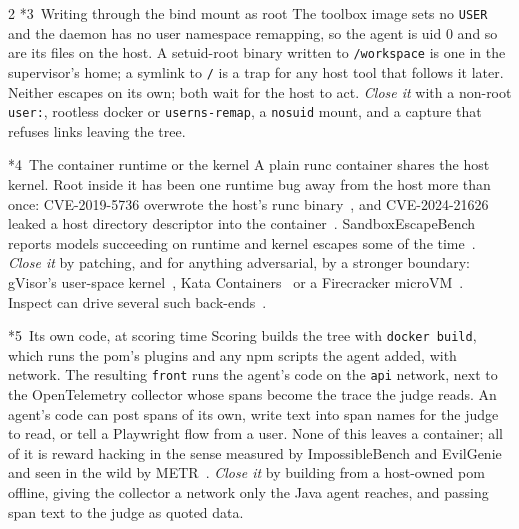 \documentclass[10pt,a4paper]{article}
\makeatletter
\renewcommand\subsection{\@startsection{subsection}{2}{0pt}{8pt}{2pt}%
  {\display\bfseries\normalsize\color{ink}}}
\makeatother
\begin{document}
\begin{multicols}{2}
\subsection*{3\ Writing through the bind mount as root}
The toolbox image sets no \texttt{USER} and the daemon has no user
namespace remapping, so the agent is uid 0 and so are its files on the
host. A setuid-root binary written to \texttt{/workspace} is one in the
supervisor's home; a symlink to \texttt{/} is a trap for any host tool
that follows it later. Neither escapes on its own; both wait for the
host to act.
\emph{Close it} with a non-root \texttt{user:}, rootless docker or
\texttt{userns-remap}, a \texttt{nosuid} mount, and a capture that refuses
links leaving the tree.

\subsection*{4\ The container runtime or the kernel}
A plain runc container shares the host kernel. Root inside it has been one
runtime bug away from the host more than once: CVE-2019-5736 overwrote
the host's runc binary~\cite{cve5736}, and CVE-2024-21626 leaked a host
directory descriptor into the container~\cite{cve21626}.
SandboxEscapeBench reports models succeeding on runtime and kernel escapes
some of the time~\cite{sandboxescape}.
\emph{Close it} by patching, and for anything adversarial, by a stronger
boundary: gVisor's user-space kernel~\cite{gvisor}, Kata
Containers~\cite{kata} or a Firecracker microVM~\cite{firecracker}.
Inspect can drive several such back-ends~\cite{aisisandbox}.

\subsection*{5\ Its own code, at scoring time}
Scoring builds the tree with \texttt{docker build}, which runs the pom's
plugins and any npm scripts the agent added, with network. The resulting
\texttt{front} runs the agent's code on the \texttt{api} network, next to
the OpenTelemetry collector whose spans become the trace the judge reads.
An agent's code can post spans of its own, write text into span names for
the judge to read, or tell a Playwright flow from a user. None of this
leaves a container; all of it is reward hacking in the sense measured by
ImpossibleBench and EvilGenie~\cite{impossiblebench, evilgenie} and seen
in the wild by METR~\cite{metrhack}.
\emph{Close it} by building from a host-owned pom offline, giving the
collector a network only the Java agent reaches, and passing span text to
the judge as quoted data.
\end{multicols}
\end{document}
